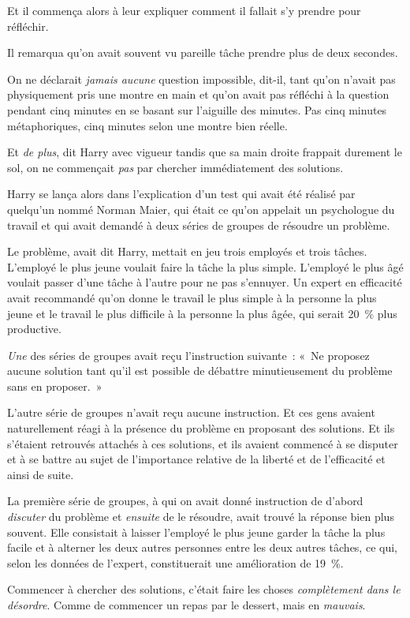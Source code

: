 Et il commença alors à leur expliquer comment il fallait s'y prendre pour réfléchir.

Il remarqua qu'on avait souvent vu pareille tâche prendre plus de deux secondes.

On ne déclarait \emph{jamais aucune} question impossible, dit-il, tant qu'on n'avait pas physiquement pris une montre en main et qu'on avait pas réfléchi à la question pendant cinq minutes en se basant sur l'aiguille des minutes. Pas cinq minutes métaphoriques, cinq minutes selon une montre bien réelle.

Et \emph{de plus}, dit Harry avec vigueur tandis que sa main droite frappait durement le sol, on ne commençait \emph{pas} par chercher immédiatement des solutions.

Harry se lança alors dans l'explication d'un test qui avait été réalisé par quelqu'un nommé Norman Maier, qui était ce qu'on appelait un psychologue du travail et qui avait demandé à deux séries de groupes de résoudre un problème.

Le problème, avait dit Harry, mettait en jeu trois employés et trois tâches. L'employé le plus jeune voulait faire la tâche la plus simple. L'employé le plus âgé voulait passer d'une tâche à l'autre pour ne pas s'ennuyer. Un expert en efficacité avait recommandé qu'on donne le travail le plus simple à la personne la plus jeune et le travail le plus difficile à la personne la plus âgée, qui serait 20~\% plus productive.

\emph{Une} des séries de groupes avait reçu l'instruction suivante~: «~Ne proposez aucune solution tant qu'il est possible de débattre minutieusement du problème sans en proposer.~»

L'autre série de groupes n'avait reçu aucune instruction. Et ces gens avaient naturellement réagi à la présence du problème en proposant des solutions. Et ils s'étaient retrouvés attachés à ces solutions, et ils avaient commencé à se disputer et à se battre au sujet de l'importance relative de la liberté et de l'efficacité et ainsi de suite.

La première série de groupes, à qui on avait donné instruction de d'abord \emph{discuter} du problème et \emph{ensuite} de le résoudre, avait trouvé la réponse bien plus souvent. Elle consistait à laisser l'employé le plus jeune garder la tâche la plus facile et à alterner les deux autres personnes entre les deux autres tâches, ce qui, selon les données de l'expert, constituerait une amélioration de 19~\%.

Commencer à chercher des solutions, c'était faire les choses \emph{complètement dans le désordre}. Comme de commencer un repas par le dessert, mais en \emph{mauvais}.

